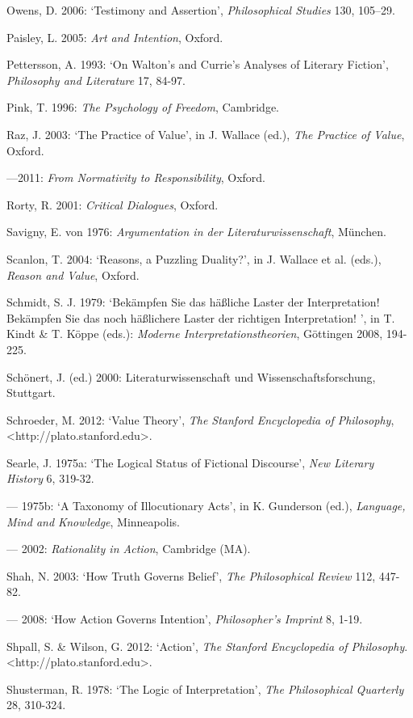 \begin{hangparas}{.5cm}{1}
Owens, D. 2006: `Testimony and Assertion', \emph{Philosophical Studies} 130, 105--29.

Paisley, L. 2005: \emph{Art and Intention}, Oxford.

Pettersson, A. 1993: `On Walton's and Currie's Analyses of Literary Fiction', \emph{Philosophy and Literature} 17, 84-97.

Pink, T. 1996: \emph{The Psychology of Freedom}, Cambridge.

Raz, J. 2003: `The Practice of Value', in J. Wallace (ed.), \emph{The Practice of Value}, Oxford.

---2011: \emph{From Normativity to Responsibility}, Oxford. 

Rorty, R. 2001: \emph{Critical Dialogues}, Oxford.

Savigny, E. von 1976: \emph{Argumentation in der Literaturwissenschaft}, M\"unchen.

Scanlon, T. 2004: `Reasons, a Puzzling Duality?', in J. Wallace et al. (eds.), \emph{Reason and Value}, Oxford.

Schmidt, S. J. 1979: `Bek\"ampfen Sie das h\"a{\ss}liche Laster der Interpretation! Bek\"ampfen Sie das noch h\"a{\ss}lichere Laster der richtigen Interpretation! ', in T. Kindt \& T. K\"oppe (eds.): \emph{Moderne Interpretationstheorien}, G\"ottingen 2008, 194-225.

Sch\"onert, J. (ed.) 2000: Literaturwissenschaft und Wissenschaftsforschung, Stuttgart.

Schroeder, M. 2012: `Value Theory', \emph{The Stanford Encyclopedia of Philosophy}, \textless{}http://plato.stanford.edu\textgreater{}.

Searle, J. 1975a: `The Logical Status of Fictional Discourse', \emph{New Literary History} 6, 319-32.

--- 1975b: `A Taxonomy of Illocutionary Acts', in K. Gunderson (ed.), \emph{Language, Mind and Knowledge}, Minneapolis.

--- 2002: \emph{Rationality in Action}, Cambridge (MA). 

Shah, N. 2003: `How Truth Governs Belief', \emph{The Philosophical Review} 112, 447-82.

--- 2008: `How Action Governs Intention', \emph{Philosopher's Imprint} 8, 1-19.

Shpall, S. \& Wilson, G. 2012: `Action', \emph{The Stanford Encyclopedia of Philosophy}. \textless{}http://plato.stanford.edu\textgreater{}.

Shusterman, R. 1978: `The Logic of Interpretation', \emph{The Philosophical Quarterly} 28, 310-324.


\end{hangparas}
